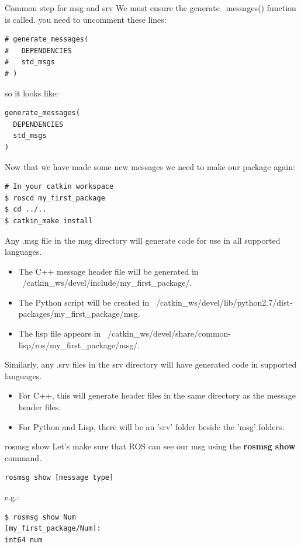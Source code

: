 \begin{frame}{Common step for msg and srv}
We must ensure the generate\_messages() function is called. you need to uncomment these lines:
\begin{lstlisting}[language=shell]
# generate_messages(
#   DEPENDENCIES
#   std_msgs
# )
\end{lstlisting}

so it looks like:
\begin{lstlisting}[language=shell]
generate_messages(
  DEPENDENCIES
  std_msgs
)
\end{lstlisting}

Now that we have made some new messages we need to make our package again:

\begin{lstlisting}[language=shell]
# In your catkin workspace
$ roscd my_first_package
$ cd ../..
$ catkin_make install
\end{lstlisting}

\framebreak
Any .msg file in the msg directory will generate code for use in all supported languages.
\begin{itemize}
 \item The C++ message header file will be generated in ~/catkin\_ws/devel/include/my\_first\_package/. 
 \item The Python script will be created in ~/catkin\_ws/devel/lib/python2.7/dist-packages/my\_first\_package/msg.
 \item The lisp file appears in ~/catkin\_ws/devel/share/common-lisp/ros/my\_first\_package/msg/.
\end{itemize}

\vspace{.1cm}
Similarly, any .srv files in the srv directory will have generated code in supported languages.
\begin{itemize}
  \item For C++, this will generate header files in the same directory as the message header files. 
  \item For Python and Lisp, there will be an 'srv' folder beside the 'msg' folders.
\end{itemize}
\end{frame}

\begin{frame}[fragile]{rosmsg show}
Let's make sure that ROS can see our msg using the \textbf{rosmsg show} command.
\begin{lstlisting}[language=syntax]
rosmsg show [message type]
\end{lstlisting}

e.g.:
\begin{lstlisting}[language=shell]
$ rosmsg show Num
[my_first_package/Num]:
int64 num
\end{lstlisting}
\end{frame}

